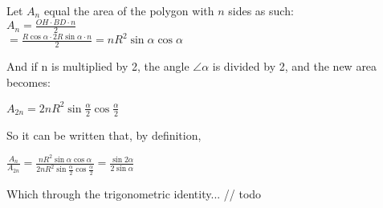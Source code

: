 Let $A_{n}$ equal the area of the polygon with $n$ sides as such: \\
$A_{n} = \frac{OH \cdot BD \cdot n}{2}$ \\
$= \frac{R \cos{\alpha} \cdot 2 R \sin{\alpha} \cdot n}{2} = n R^2 \sin{\alpha} \cos{\alpha}$

And if n is multiplied by 2, the angle $\angle \alpha$ is divided by 2, 
and the new area becomes: 

$A_{2n} = 2n R^2 \sin{\frac{\alpha}{2}} \cos{\frac{\alpha}{2}}$

So it can be written that, by definition,

$\frac{A_{n}}{A_{2n}} = \frac{n R^2 \sin{\alpha} \cos{\alpha}}{2 n R^2 \sin{\frac{\alpha}{2}} \cos{\frac{\alpha}{2}}} = \frac{\sin{2 \alpha}}{2 \sin{\alpha}}$

Which through the trigonometric identity... // todo




